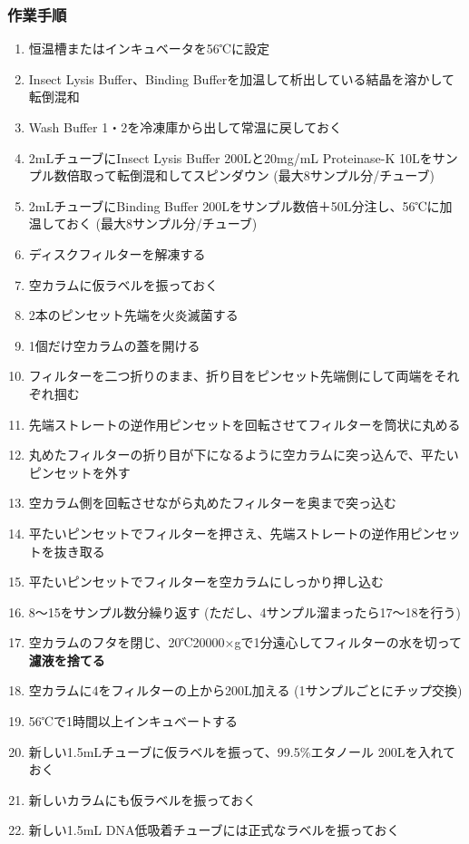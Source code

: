 \documentclass[titlepage,10pt,a4paper,uplatex]{jsbook}
\renewcommand{\textbf}[1]{{\bfseries\sffamily#1}}
\begin{document}
\subsubsection{作業手順}
\begin{enumerate}
\item 恒温槽またはインキュベータを56℃に設定
\item Insect Lysis Buffer、Binding Bufferを加温して析出している結晶を溶かして転倒混和
\item Wash Buffer 1・2を冷凍庫から出して常温に戻しておく
\item 2mLチューブにInsect Lysis Buffer 200{\textmu}Lと20mg/mL Proteinase-K 10{\textmu}Lをサンプル数倍取って転倒混和してスピンダウン (最大8サンプル分/チューブ)
\item 2mLチューブにBinding Buffer 200{\textmu}Lをサンプル数倍＋50{\textmu}L分注し、56℃に加温しておく (最大8サンプル分/チューブ)
\item ディスクフィルターを解凍する
\item 空カラムに仮ラベルを振っておく
\item 2本のピンセット先端を火炎滅菌する
\item 1個だけ空カラムの蓋を開ける
\item フィルターを二つ折りのまま、折り目をピンセット先端側にして両端をそれぞれ掴む
\item 先端ストレートの逆作用ピンセットを回転させてフィルターを筒状に丸める
\item 丸めたフィルターの折り目が下になるように空カラムに突っ込んで、平たいピンセットを外す
\item 空カラム側を回転させながら丸めたフィルターを奥まで突っ込む
\item 平たいピンセットでフィルターを押さえ、先端ストレートの逆作用ピンセットを抜き取る
\item 平たいピンセットでフィルターを空カラムにしっかり押し込む
\item 8～15をサンプル数分繰り返す (ただし、4サンプル溜まったら17～18を行う)
\item 空カラムのフタを閉じ、20℃20000×gで1分遠心してフィルターの水を切って\textbf{濾液を捨てる}
\item 空カラムに4をフィルターの上から200{\textmu}L加える (1サンプルごとにチップ交換)
\item 56℃で1時間以上インキュベートする
\item 新しい1.5mLチューブに仮ラベルを振って、99.5\%エタノール 200{\textmu}Lを入れておく
\item 新しいカラムにも仮ラベルを振っておく
\item 新しい1.5mL DNA低吸着チューブには正式なラベルを振っておく

\end{enumerate}
\end{document}
